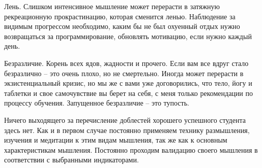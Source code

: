Лень. Слишком интенсивное мышление может перерасти в затяжную рекреационную прокрастинацию, которая сменится ленью. Наблюдение за видимым прогрессом необходимо, каким бы не был охуенный отдых нужно возвращаться за программирование, обновлять мотивацию, если нужно каждый день.

Безразличие. Корень всех ядов, жадности и прочего. Если вам все вдруг стало безразлично – это очень плохо, но не смертельно. Иногда может перерасти в экзистенциальный кризис, но мы же с вами уже договорились, что тело, йогу и таблетки и свое самочувствие вы берет на себя, с меня только рекомендации по процессу обучения. Запущенное безразличие -- это тупость.

Ничего выходящего за перечисление доблестей хорошего успешного студента здесь нет. Как и в первом случае постоянно применяем технику размышления, изучения и медитации к этим видам мышления, так же как к основным характеристикам мышления. Постоянно проходим валидацию своего мышления в соответствии с выбранными индикаторами.



\normalsize
